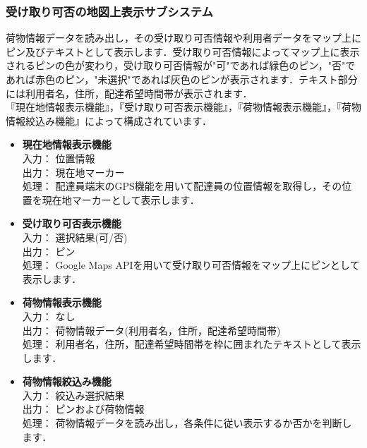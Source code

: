 \documentclass[a4j,titlepage]{jarticle}
\begin{document}
\subsubsection{受け取り可否の地図上表示サブシステム}
荷物情報データを読み出し，その受け取り可否情報や利用者データをマップ上にピン及びテキストとして表示します．受け取り可否情報によってマップ上に表示されるピンの色が変わり，受け取り可否情報が"可"であれば緑色のピン，"否"であれば赤色のピン，"未選択"であれば灰色のピンが表示されます．テキスト部分には利用者名，住所，配達希望時間帯が表示されます． \\
『現在地情報表示機能』，『受け取り可否表示機能』，『荷物情報表示機能』，『荷物情報絞込み機能』によって構成されています．
\begin{itemize}
\item \textbf{現在地情報表示機能} \\
入力： 位置情報 \\
出力： 現在地マーカー \\
処理： 配達員端末のGPS機能を用いて配達員の位置情報を取得し，その位置を現在地マーカーとして表示します．
\item \textbf{受け取り可否表示機能} \\
入力： 選択結果(可/否) \\
出力： ピン \\
処理： Google Maps APIを用いて受け取り可否情報をマップ上にピンとして表示します．
\item \textbf{荷物情報表示機能} \\
入力： なし \\
出力： 荷物情報データ(利用者名，住所，配達希望時間帯) \\
処理： 利用者名，住所，配達希望時間帯を枠に囲まれたテキストとして表示します．
\item \textbf{荷物情報絞込み機能} \\
入力： 絞込み選択結果 \\
出力： ピンおよび荷物情報 \\
処理： 荷物情報データを読み出し，各条件に従い表示するか否かを判断します．
\end{itemize}
\end{document}
